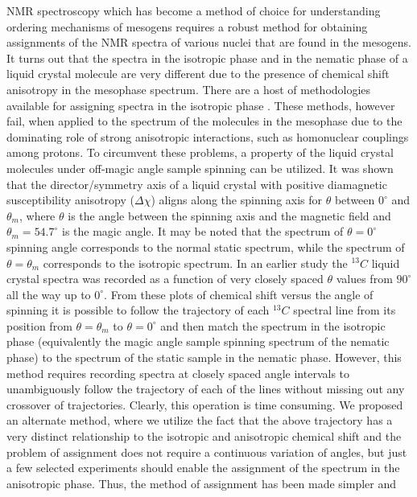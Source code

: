NMR spectroscopy which has become a method of choice for understanding
ordering mechanisms of mesogens requires a robust method for obtaining
assignments of the NMR spectra of various nuclei that are found in the mesogens.
It turns out that the spectra in the isotropic phase and in the nematic phase of a
liquid crystal molecule are very different due to the presence of chemical shift
anisotropy in the mesophase spectrum. There are a host of methodologies
available for assigning spectra in the isotropic phase \cite{chap31-key4}. These methods, however
fail, when applied to the spectrum of the molecules in the mesophase due to the
dominating role of strong anisotropic interactions, such as homonuclear
couplings among protons. To circumvent these problems, a property of the liquid
crystal molecules under off-magic angle sample spinning can be utilized. It was
shown that the director/symmetry axis of a liquid crystal with positive
diamagnetic susceptibility anisotropy ($\Delta \chi$) aligns along the spinning axis for $\theta$
between $0^{\circ}$ and $\theta_m$, where $\theta$ is the angle between the spinning axis and the
magnetic field and $\theta_m = 54.7^{\circ}$ is the magic angle. It may be noted that the
spectrum of $\theta = 0^{\circ}$ spinning angle corresponds to the normal static spectrum,
while the spectrum of $\theta = \theta_m$ corresponds to the isotropic spectrum. In an earlier
study the ${}^{13}C$ liquid crystal spectra was recorded as a function of very closely
spaced $\theta$ values from $90^{\circ}$ all the way up to $0^{\circ}$. From these plots of chemical shift
versus the angle of spinning it is possible to follow the trajectory of each
${}^{13}C$ spectral line from its position from $\theta = \theta_m$ to $\theta = 0^\circ$ and then match the spectrum
in the isotropic phase (equivalently the magic angle sample spinning spectrum of
the nematic phase) to the spectrum of the static sample in the nematic phase.
However, this method requires recording spectra at closely spaced angle intervals
to unambiguously follow the trajectory of each of the lines without missing out
any crossover of trajectories.  Clearly, this operation is time consuming. We
proposed an alternate method, where we utilize the fact that the above trajectory
has a very distinct relationship to the isotropic and anisotropic chemical shift and
the problem of assignment does not require a continuous variation of angles, but
just a few selected experiments should enable the assignment of the spectrum in
the anisotropic phase. Thus, the method of assignment has been made simpler and
